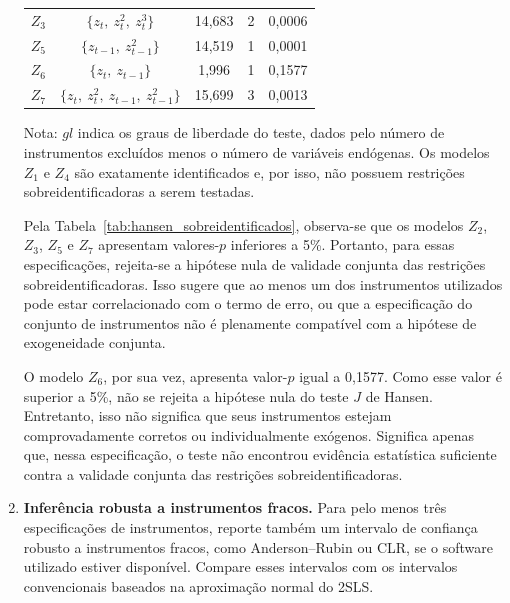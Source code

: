 \documentclass[12pt,a4paper]{article}
\begin{document}
\begin{enumerate}[label=\textbf{\arabic*.}]
\begin{table}[H]
\begin{tabular}{lcccc}
        $Z_3$ 
        & $\{z_t,\ z_t^2,\ z_t^3\}$ 
        & 14{,}683 
        & 2 
        & 0{,}0006 \\

        $Z_5$ 
        & $\{z_{t-1},\ z_{t-1}^2\}$ 
        & 14{,}519 
        & 1 
        & 0{,}0001 \\

        $Z_6$ 
        & $\{z_t,\ z_{t-1}\}$ 
        & 1{,}996 
        & 1 
        & 0{,}1577 \\

        $Z_7$ 
        & $\{z_t,\ z_t^2,\ z_{t-1},\ z_{t-1}^2\}$ 
        & 15{,}699 
        & 3 
        & 0{,}0013 \\
        \hline
    \end{tabular}

    \vspace{0.3em}
    \begin{minipage}{0.92\textwidth}
    \footnotesize
    Nota: $gl$ indica os graus de liberdade do teste, dados pelo número de instrumentos excluídos menos o número de variáveis endógenas. Os modelos $Z_1$ e $Z_4$ são exatamente identificados e, por isso, não possuem restrições sobreidentificadoras a serem testadas.
    \end{minipage}
\end{table}

Pela Tabela~\ref{tab:hansen_sobreidentificados}, observa-se que os modelos $Z_2$, $Z_3$, $Z_5$ e $Z_7$ apresentam valores-$p$ inferiores a 5\%. Portanto, para essas especificações, rejeita-se a hipótese nula de validade conjunta das restrições sobreidentificadoras. Isso sugere que ao menos um dos instrumentos utilizados pode estar correlacionado com o termo de erro, ou que a especificação do conjunto de instrumentos não é plenamente compatível com a hipótese de exogeneidade conjunta.

O modelo $Z_6$, por sua vez, apresenta valor-$p$ igual a 0{,}1577. Como esse valor é superior a 5\%, não se rejeita a hipótese nula do teste $J$ de Hansen. Entretanto, isso não significa que seus instrumentos estejam comprovadamente corretos ou individualmente exógenos. Significa apenas que, nessa especificação, o teste não encontrou evidência estatística suficiente contra a validade conjunta das restrições sobreidentificadoras.

\item \textbf{Inferência robusta a instrumentos fracos.} Para pelo menos três
    especificações de instrumentos, reporte também um intervalo de confiança robusto
    a instrumentos fracos, como Anderson--Rubin ou CLR, se o software utilizado
    estiver disponível. Compare esses intervalos com os intervalos convencionais
    baseados na aproximação normal do 2SLS.


\end{enumerate}
\end{document}
